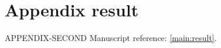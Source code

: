 \documentclass{article}
\begin{document}
\setcounter{section}{6}
\section{Appendix result}\label{app:result}
APPENDIX-SECOND
Manuscript reference: \ref{main:result}.
\end{document}
